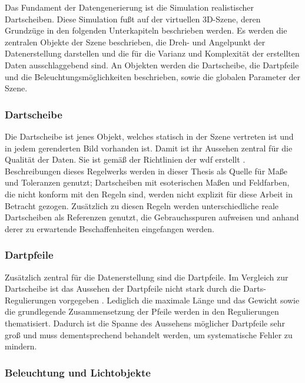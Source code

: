 Das Fundament der Datengenerierung ist die Simulation realistischer Dartscheiben. Diese Simulation fußt auf der virtuellen 3D-Szene, deren Grundzüge in den folgenden Unterkapiteln beschrieben werden. Es werden die zentralen Objekte der Szene beschrieben, die Dreh- und Angelpunkt der Datenerstellung darstellen und die für die Varianz und Komplexität der erstellten Daten ausschlaggebend sind. An Objekten werden die Dartscheibe, die Dartpfeile und die Beleuchtungsmöglichkeiten beschrieben, sowie die globalen Parameter der Szene.

\subsubsection{Dartscheibe}
\label{sec:dartscheibe}

Die Dartscheibe ist jenes Objekt, welches statisch in der Szene vertreten ist und in jedem gerenderten Bild vorhanden ist. Damit ist ihr Aussehen zentral für die Qualität der Daten. Sie ist gemäß der Richtlinien  der \ac{wdf} erstellt \cite{wdf-rules}. Beschreibungen dieses Regelwerks werden in dieser Thesis als Quelle für Maße und Toleranzen genutzt; Dartscheiben mit esoterischen Maßen und Feldfarben, die nicht konform mit den Regeln sind, werden nicht explizit für diese Arbeit in Betracht gezogen. Zusätzlich zu diesen Regeln werden unterschiedliche reale Dartscheiben als Referenzen genutzt, die Gebrauchsspuren aufweisen und anhand derer zu erwartende Beschaffenheiten eingefangen werden.

\subsubsection{Dartpfeile}
\label{sec:dartpfeile}

Zusätzlich zentral für die Datenerstellung sind die Dartpfeile. Im Vergleich zur Dartscheibe ist das Aussehen der Dartpfeile nicht stark durch die Darts-Regulierungen vorgegeben \cite{wdf-rules,pdc_rules}. Lediglich die maximale Länge und das Gewicht sowie die grundlegende Zusammensetzung der Pfeile werden in den Regulierungen thematisiert. Dadurch ist die Spanne des Aussehens möglicher Dartpfeile sehr groß und muss dementsprechend behandelt werden, um systematische Fehler zu mindern.

\subsubsection{Beleuchtung und Lichtobjekte}
\label{sec:lichtobjekte}

